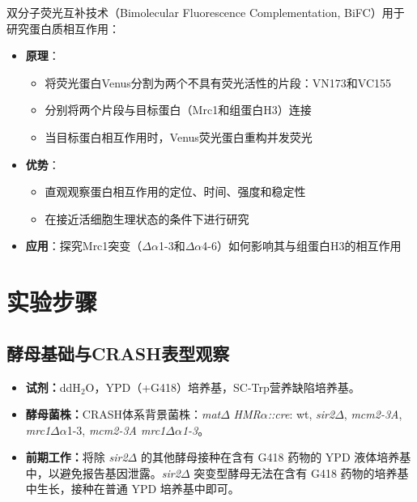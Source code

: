 \documentclass[a4,10pt]{article}
\begin{document}
双分子荧光互补技术（Bimolecular Fluorescence Complementation, BiFC）用于研究蛋白质相互作用：

\begin{itemize}
    \item \textbf{原理}：
    \begin{itemize}
        \item 将荧光蛋白Venus分割为两个不具有荧光活性的片段：VN173和VC155
        \item 分别将两个片段与目标蛋白（Mrc1和组蛋白H3）连接
        \item 当目标蛋白相互作用时，Venus荧光蛋白重构并发荧光
    \end{itemize}
    
    \item \textbf{优势}：
    \begin{itemize}
        \item 直观观察蛋白相互作用的定位、时间、强度和稳定性
        \item 在接近活细胞生理状态的条件下进行研究
    \end{itemize}
    
    \item \textbf{应用}：探究Mrc1突变（$\Delta\alpha$1-3和$\Delta\alpha$4-6）如何影响其与组蛋白H3的相互作用
\end{itemize}

\section{实验步骤}

\subsection{酵母基础与CRASH表型观察}

\begin{itemize}
    \item \textbf{试剂：}ddH$_2$O，YPD（+G418）培养基，SC-Trp营养缺陷培养基。
    \item \textbf{酵母菌株：}CRASH体系背景菌株：\textit{mat}$\Delta$ \textit{HMR}$\alpha$\textit{::cre}: wt, \textit{sir2}$\Delta$, \textit{mcm2-3A}, \textit{mrc1}$\Delta\alpha$1-3, \textit{mcm2-3A mrc1}$\Delta \alpha$\textit{1-3}。
    \item \textbf{前期工作：}将除 \textit{sir2}$\Delta$ 的其他酵母接种在含有 G418 药物的 YPD 液体培养基中，以避免报告基因泄露。\textit{sir2}$\Delta$ 突变型酵母无法在含有 G418 药物的培养基中生长，接种在普通 YPD 培养基中即可。
\end{itemize}
\end{document}
